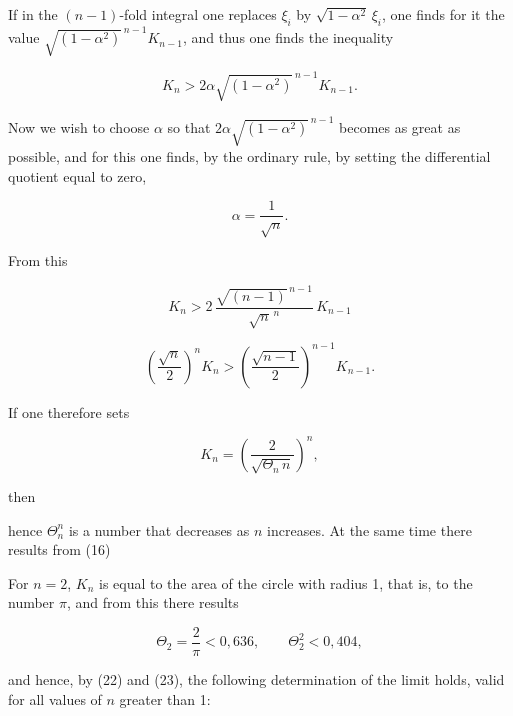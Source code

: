 If in the $(n-1)$-fold integral one replaces $\xi_i$ by
$\sqrt{1-\alpha^2}\,\xi_i$, one finds for it the value
$\sqrt{(1-\alpha^2)}^{\,n-1} K_{n-1}$, and thus one finds the
inequality

\[
K_n > 2\alpha \sqrt{(1-\alpha^2)}^{\,n-1} K_{n-1}.
\]

Now we wish to choose $\alpha$ so that $2\alpha
\sqrt{(1-\alpha^2)}^{\,n-1}$ becomes as great as possible, and for
this one finds, by the ordinary rule, by setting the differential
quotient equal to zero,

\[
\alpha = \frac{1}{\sqrt{n}}.
\]

From this

\[
K_n > 2\, \frac{\sqrt{(n-1)}^{\,n-1}}{\sqrt{n}^{\,n}}\, K_{n-1}
\]

\[
\left(\frac{\sqrt{n}}{2}\right)^{n} K_n > \left(\frac{\sqrt{n-1}}{2}\right)^{n-1} K_{n-1}.
\]

If one therefore sets

\[
K_n = \left(\frac{2}{\sqrt{\Theta_n\, n}}\right)^{n},
\]

then


hence $\Theta_n^n$ is a number that decreases as $n$ increases. At the
same time there results from (16)


For $n = 2$, $K_n$ is equal to the area of the circle with radius 1,
that is, to the  number $\pi$, and from this
there results

\[
\Theta_2 = \frac{2}{\pi} < 0{,}636,\qquad \Theta_2^2 < 0{,}404,
\]

and hence, by (22) and (23), the following determination of the limit
holds, valid for all values of $n$ greater than 1:


